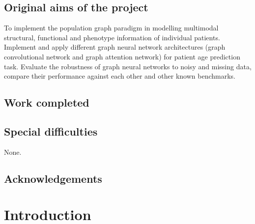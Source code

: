 \documentclass[12pt,a4paper,twoside, openright, hidelinks]{report}
\begin{document}

\section*{Original aims of the project}

To implement the population graph paradigm in modelling multimodal structural, functional and phenotype information of individual patients. Implement and apply different graph neural network architectures (graph convolutional network and graph attention network) for patient age prediction task. Evaluate the robustness of graph neural networks to noisy and missing data, compare their performance against each other and other known benchmarks.

\section*{Work completed}

\section*{Special difficulties}

None.

\tableofcontents

\newpage
\section*{Acknowledgements}

\pagestyle{headings}

\chapter{Introduction}
\end{document}

